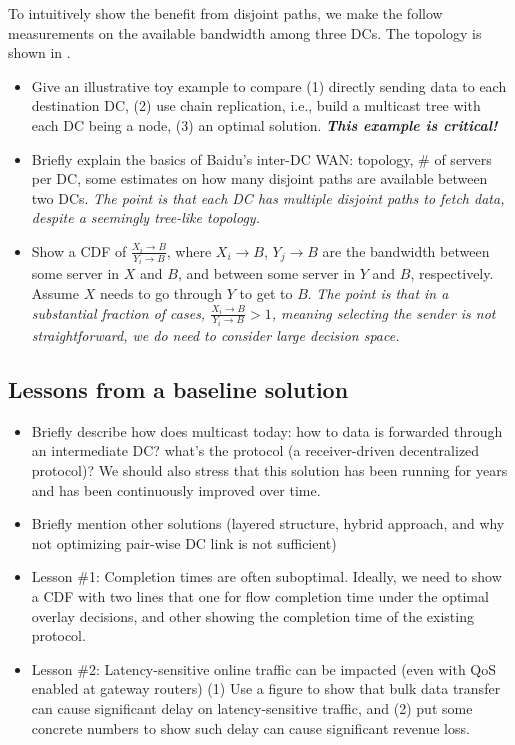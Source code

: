 To intuitively show the benefit from disjoint paths, we make the follow measurements on the available bandwidth among three DCs. The topology is shown in \fillme.

\begin{itemize}

\item Give an illustrative toy example to compare (1) directly sending data to each destination DC, (2) use chain replication, i.e., build a multicast tree with each DC being a node, (3) an optimal solution.
{\em\bf This example is critical!}

\item Briefly explain the basics of Baidu's inter-DC WAN: topology, \# of servers per DC, some estimates on how many disjoint paths are available between two DCs.
{\em The point is that each DC has multiple disjoint paths to fetch data, despite a seemingly tree-like topology.}

\item Show a CDF of $\frac{X_i\rightarrow B}{Y_i\rightarrow B}$, where $X_i\rightarrow B$, $Y_j\rightarrow B$ are the bandwidth between some server in $X$ and $B$, and between some server in $Y$ and $B$, respectively. Assume $X$ needs to go through $Y$ to get to $B$.
{\em The point is that in a substantial fraction of cases, $\frac{X_i\rightarrow B}{Y_i\rightarrow B}>1$, meaning selecting the sender is not straightforward, we do need to consider large decision space.}

\end{itemize}

\subsection{Lessons from a baseline solution}
\label{subsec:motivation:baseline}
\begin{itemize}

\item Briefly describe how \company does multicast today: how to data is forwarded through an intermediate DC? what's the protocol (a receiver-driven decentralized protocol)?
We should also stress that this solution has been running for \fillme years and has been continuously improved over time.

\item Briefly mention other solutions (layered structure, hybrid approach, and why not optimizing pair-wise DC link is not sufficient)

\item Lesson \#1: Completion times are often suboptimal.
Ideally, we need to show a CDF with two lines that one for flow completion time under the optimal overlay decisions, and other showing the completion time of the existing protocol.

\item Lesson \#2: Latency-sensitive online traffic can be impacted (even with QoS enabled at gateway routers)
(1) Use a figure to show that bulk data transfer can cause significant delay on latency-sensitive traffic, and (2) put some concrete numbers to show such delay can cause significant revenue loss.

\end{itemize}

